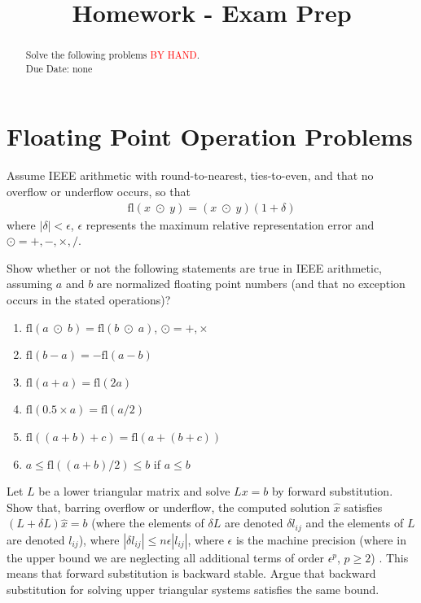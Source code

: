 \documentclass{ximera}
\begin{document}
    \title{Homework - Exam Prep}
    
    \begin{abstract} Solve the following problems \textcolor{red}{BY HAND}.
    \\
    Due Date: none
    \end{abstract}
    \maketitle

\section{Floating Point Operation Problems}
Assume IEEE arithmetic with round-to-nearest, ties-to-even, and that no overflow or underflow occurs, so that
\begin{align*}
    \text{fl}(x \; \odot\; y) = (x \; \odot\; y)(1+\delta)
\end{align*}
where $|\delta| < \epsilon$, $\epsilon$ represents the maximum relative representation error and $\odot = +, - , \times, /$.
\begin{exercise}
    Show whether or not the following statements are true in IEEE arithmetic, assuming $a$ and $b$ are normalized floating point numbers (and that no exception occurs in the stated operations)?
    \begin{enumerate}
        \item $\text{fl}(a \;\odot\; b) = \text{fl}(b \;\odot\; a)$, $\odot = +, \times$
        \item $\text{fl}(b - a) = - \text{fl}(a-b)$
        \item $\text{fl}(a + a) = \text{fl}(2a)$
        \item $\text{fl}(0.5 \times a) = \text{fl}(a/2)$
        \item $\text{fl}((a+b)+c) = \text{fl}(a+(b+c))$
        \item $a \leq \text{fl}((a+b)/2) \leq b$ if $a \leq b$
    \end{enumerate}
\end{exercise}

\begin{exercise}
    Let $L$ be a lower triangular matrix and solve $Lx = b$ by forward substitution. Show that, barring overflow or underflow, the computed solution $\hat{x}$ satisfies $(L+\delta L) \hat{x} = b$ (where the elements of $\delta L$ are denoted $\delta l_{ij}$ and the elements of $L$ are denoted $l_{ij}$), where $|\delta l_{ij}| \leq n\epsilon |l_{ij}|$, where $\epsilon$ is the machine precision (where in the upper bound we are neglecting all additional terms of order $\epsilon^p$, $p \geq 2$) . This means that forward substitution is backward stable. Argue that backward substitution for solving upper triangular systems satisfies the same bound.
\end{exercise}
\end{document}
